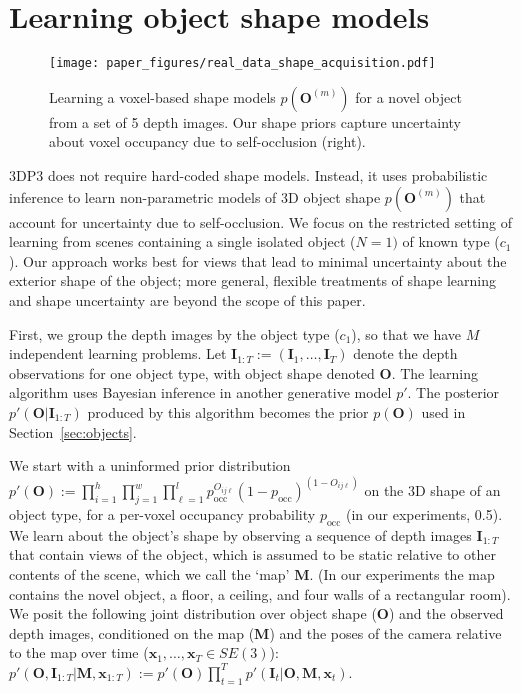 \section{Learning object shape models} \label{sec:learning-shapes}


\begin{figure}[!t]
	\centering
	\texttt{[image: paper\_figures/real\_data\_shape\_acquisition.pdf]}
	\caption{%
		Learning a voxel-based shape models $p(\mathbf{O}^{(m)})$ for a novel object from a set of 5 depth images.
		Our shape priors capture uncertainty about voxel occupancy due to self-occlusion (right).
	}
	\label{fig:shapes}
\end{figure}

3DP3 does not require hard-coded shape models. Instead, it uses
probabilistic inference to learn non-parametric models of 3D object
shape $p(\mathbf{O}^{(m)})$ that account for uncertainty due to
self-occlusion. We focus on the restricted setting of learning from
scenes containing a single isolated object ($N=1)$ of known type
($c_1$). Our approach works best for views that lead to minimal
uncertainty about the exterior shape of the object; more general,
flexible treatments of shape learning and shape uncertainty are beyond
the scope of this paper.

First, we group the depth images by the object type ($c_1$), so that
we have $M$ independent learning problems.  Let $\mathbf{I}_{1:T} :=
(\mathbf{I}_1, \ldots, \mathbf{I}_T)$ denote the depth observations
for one object type, with object shape denoted $\mathbf{O}$.  The
learning algorithm uses Bayesian inference in another generative model
$p'$.  The posterior $p'(\mathbf{O} | \mathbf{I}_{1:T})$ produced by
this algorithm becomes the prior $p(\mathbf{O})$ used in
Section~\ref{sec:objects}.

We start with a uninformed prior distribution 
$p'(\mathbf{O}) := \prod_{i=1}^h \prod_{j=1}^w \prod_{\ell=1}^l p_{\mathrm{occ}}^{O_{ij\ell}} (1 - p_{\mathrm{occ}})^{(1 - O_{ij\ell})}$
on the 3D shape of an object type,
for a per-voxel occupancy probability $p_{\mathrm{occ}}$ (in our experiments, 0.5).
We learn about the object's shape by observing a sequence of depth images $\mathbf{I}_{1:T}$ that contain views of the object, which is assumed to be static relative to other contents of the scene, which we call the `map' $\mathbf{M}$.
(In our experiments the map contains the novel object, a floor, a ceiling, and four walls of a rectangular room).
We posit the following joint distribution over object shape ($\mathbf{O}$) and the observed depth images,
conditioned on the map ($\mathbf{M}$) and the poses of the camera relative to the map over time ($\mathbf{x}_1, \ldots, \mathbf{x}_T \in SE(3)$): $p'(\mathbf{O}, \mathbf{I}_{1:T} | \mathbf{M}, \mathbf{x}_{1:T})
:=
p'(\mathbf{O})
\prod_{t=1}^T p'(\mathbf{I}_t | \mathbf{O}, \mathbf{M}, \mathbf{x}_t)$.


